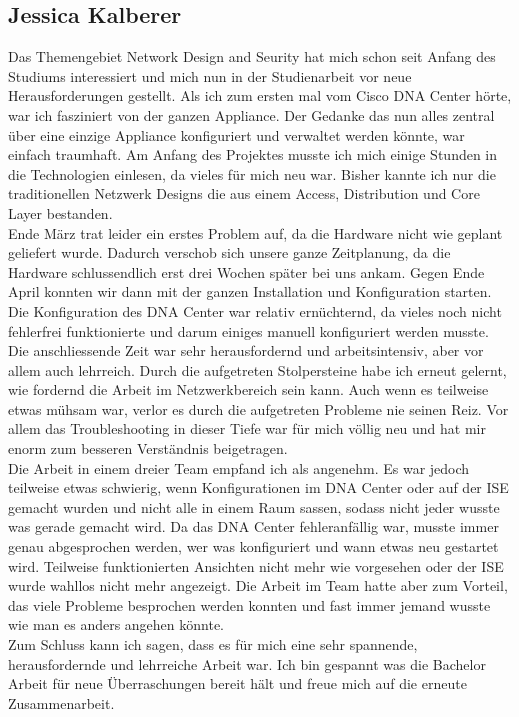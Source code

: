 \subsection{Jessica Kalberer}
Das Themengebiet Network Design and Seurity hat mich schon seit Anfang des Studiums interessiert und mich nun in der Studienarbeit vor neue Herausforderungen gestellt. Als ich zum ersten mal vom Cisco DNA Center hörte, war ich fasziniert von der ganzen Appliance. Der Gedanke das nun alles zentral über eine einzige Appliance konfiguriert und verwaltet werden könnte, war einfach traumhaft. Am Anfang des Projektes musste ich mich einige Stunden in die  Technologien einlesen, da vieles für mich neu war. Bisher kannte ich nur die traditionellen Netzwerk Designs die aus einem Access, Distribution und Core Layer bestanden.\\ 
Ende März trat leider ein erstes Problem auf, da die Hardware nicht wie geplant geliefert wurde. Dadurch verschob sich unsere ganze Zeitplanung, da die Hardware schlussendlich erst drei Wochen später bei uns ankam. Gegen Ende April konnten wir dann mit der ganzen Installation und Konfiguration starten. Die Konfiguration des DNA Center war relativ ernüchternd, da vieles noch nicht fehlerfrei funktionierte und darum einiges manuell konfiguriert werden musste. Die anschliessende Zeit war sehr herausfordernd und arbeitsintensiv, aber vor allem auch lehrreich. Durch die aufgetreten Stolpersteine habe ich erneut gelernt, wie fordernd die Arbeit im Netzwerkbereich sein kann. Auch wenn es teilweise etwas mühsam war, verlor es durch die aufgetreten Probleme nie seinen Reiz. Vor allem das Troubleshooting in dieser Tiefe war für mich völlig neu und hat mir enorm zum besseren Verständnis beigetragen. \\
Die Arbeit in einem dreier Team empfand ich als angenehm. Es war jedoch teilweise etwas schwierig, wenn Konfigurationen im DNA Center oder auf der ISE gemacht wurden und nicht alle in einem Raum sassen, sodass nicht jeder wusste was gerade gemacht wird. Da das DNA Center fehleranfällig war, musste immer genau abgesprochen werden, wer was konfiguriert und wann etwas neu gestartet wird. Teilweise funktionierten Ansichten nicht mehr wie vorgesehen oder der ISE wurde wahllos nicht mehr angezeigt. Die Arbeit im Team hatte aber zum Vorteil, das viele Probleme besprochen werden konnten und fast immer jemand wusste wie man es anders angehen könnte. 
\\
Zum Schluss kann ich sagen, dass es für mich eine sehr spannende, herausfordernde und lehrreiche Arbeit war. Ich bin gespannt was die Bachelor Arbeit für neue Überraschungen bereit hält und freue mich auf die erneute Zusammenarbeit.